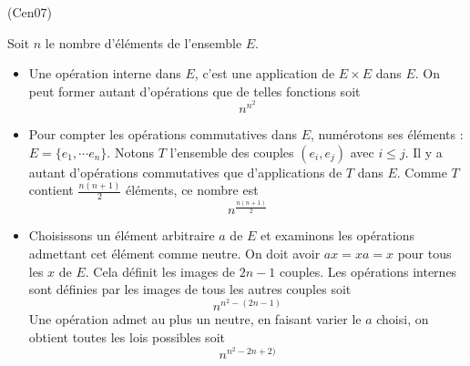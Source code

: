 \begin{tiny}(Cen07)\end{tiny}
Soit $n$ le nombre d'{\'e}l{\'e}ments de l'ensemble $E$.
\begin{itemize}
  \item Une op{\'e}ration interne dans $E$, c'est une application de $E\times E$ dans $E$. On peut former autant d'op{\'e}rations que de
  telles fonctions soit
  \[n^{n^2}\]
  \item Pour compter les op{\'e}rations commutatives dans $E$, num{\'e}rotons ses {\'e}l{\'e}ments : $E=\{e_1,\cdots e_n\}$.\newline
  Notons $T$ l'ensemble des couples $(e_i,e_j)$ avec $i\leq j$. Il y a autant d'op{\'e}rations commutatives que d'applications de $T$
  dans $E$. Comme $T$ contient $\frac{n(n+1)}{2}$ {\'e}l{\'e}ments, ce nombre est
  \[n^{\frac{n(n+1)}{2}}\]
  \item Choisissons un {\'e}l{\'e}ment arbitraire $a$ de $E$ et examinons les op{\'e}rations admettant cet {\'e}l{\'e}ment comme neutre.\newline
  On doit avoir $ax=xa=x$ pour tous les $x$ de $E$. Cela d{\'e}finit les images de $2n-1$ couples. Les op{\'e}rations internes sont
  d{\'e}finies par les images de tous les autres couples soit
  \[n^{n^2-(2n-1)}\]
  Une op{\'e}ration admet au plus un neutre, en faisant varier le $a$ choisi, on obtient toutes les lois possibles soit
  \[n^{n^2-2n+2)}\]
\end{itemize}